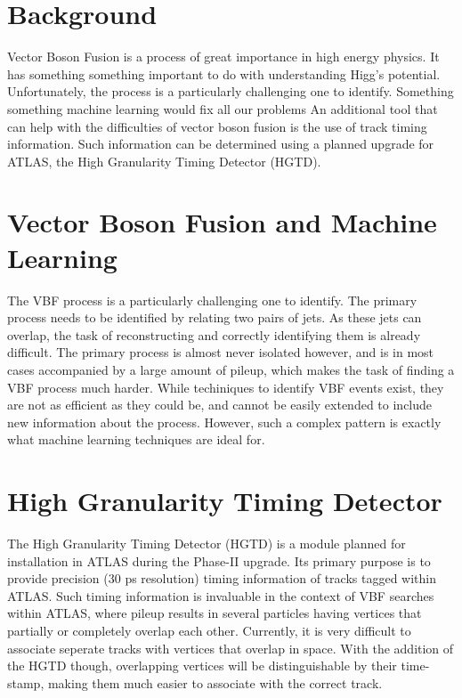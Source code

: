\documentclass[paper=a4,fontsize=12pt]{article}
\begin{document}
\section*{Background}
    Vector Boson Fusion is a process of great importance in high energy physics.
    It has something something important to do with understanding Higg's potential. %
    Unfortunately, the process is a particularly challenging one to identify.
    Something something machine learning would fix all our problems %
    An additional tool that can help with the difficulties of vector boson fusion is the use of track timing information. Such information can be determined using a planned upgrade for ATLAS, the High Granularity Timing Detector (HGTD).






\section*{Vector Boson Fusion and Machine Learning}
    The VBF process is a particularly challenging one to identify. The primary process needs to be identified by relating two pairs of jets. As these jets can overlap, the task of reconstructing and correctly identifying them is already difficult. The primary process is almost never isolated however, and is in most cases accompanied by a large amount of pileup, which makes the task of finding a VBF process much harder. While techiniques to identify VBF events exist, they are not as efficient as they could be, and cannot be easily extended to include new information about the process. However, such a complex pattern is exactly what machine learning techniques are ideal for. 


\section*{High Granularity Timing Detector}
    The High Granularity Timing Detector (HGTD) is a module planned for installation in ATLAS during the Phase-II upgrade. Its primary purpose is to provide precision (30 ps resolution) timing information of tracks tagged within ATLAS. Such timing information is invaluable in the context of VBF searches within ATLAS, where pileup results in several particles having vertices that partially or completely overlap each other. Currently, it is very difficult to associate seperate tracks with vertices that overlap in space. With the addition of the HGTD though, overlapping vertices will be distinguishable by their time-stamp, making them much easier to associate with the correct track. 
    
\end{document}

